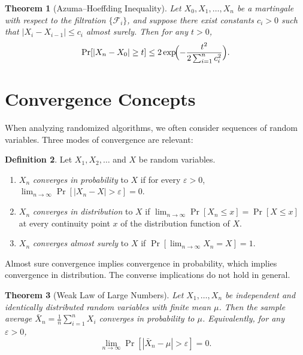 \documentclass[twoside,12pt]{book}
\theoremstyle{plain}
\newtheorem{theorem}{Theorem}[chapter]
\theoremstyle{definition}
\newtheorem{definition}[theorem]{Definition}
\theoremstyle{remark}
\begin{document}
\begin{theorem}[Azuma--Hoeffding Inequality]
\label{app:thm:azuma}
Let $X_0, X_1, \ldots, X_n$ be a martingale with respect to the filtration
$\{\mathcal{F}_i\}$, and suppose there exist constants $c_i > 0$ such that
$|X_i - X_{i-1}| \leq c_i$ almost surely. Then for any $t > 0$,
\[
\Pr[|X_n - X_0| \geq t] \leq 2 \exp\!\Bigl(-\frac{t^2}{2\sum_{i=1}^{n} c_i^2}\Bigr).
\]
\end{theorem}

\section{Convergence Concepts}
\label{app:sec:convergence}

When analyzing randomized algorithms, we often consider sequences of
random variables. Three modes of convergence are relevant:

\begin{definition}
Let $X_1, X_2, \ldots$ and $X$ be random variables.
\begin{enumerate}
\item $X_n$ \emph{converges in probability} to $X$ if for every $\varepsilon > 0$,
      $\lim_{n\to\infty} \Pr[|X_n - X| > \varepsilon] = 0$.
\item $X_n$ \emph{converges in distribution} to $X$ if
      $\lim_{n\to\infty} \Pr[X_n \leq x] = \Pr[X \leq x]$ at every continuity
      point $x$ of the distribution function of $X$.
\item $X_n$ \emph{converges almost surely} to $X$ if
      $\Pr[\lim_{n\to\infty} X_n = X] = 1$.
\end{enumerate}
\end{definition}

Almost sure convergence implies convergence in probability, which implies
convergence in distribution. The converse implications do not hold in
general.

\begin{theorem}[Weak Law of Large Numbers]
Let $X_1, \ldots, X_n$ be independent and identically distributed random
variables with finite mean $\mu$. Then the sample average
$\bar{X}_n = \frac{1}{n}\sum_{i=1}^{n} X_i$ converges in probability to
$\mu$. Equivalently, for any $\varepsilon > 0$,
\[
\lim_{n\to\infty} \Pr[|\bar{X}_n - \mu| > \varepsilon] = 0.
\]
\end{theorem}
\end{document}
